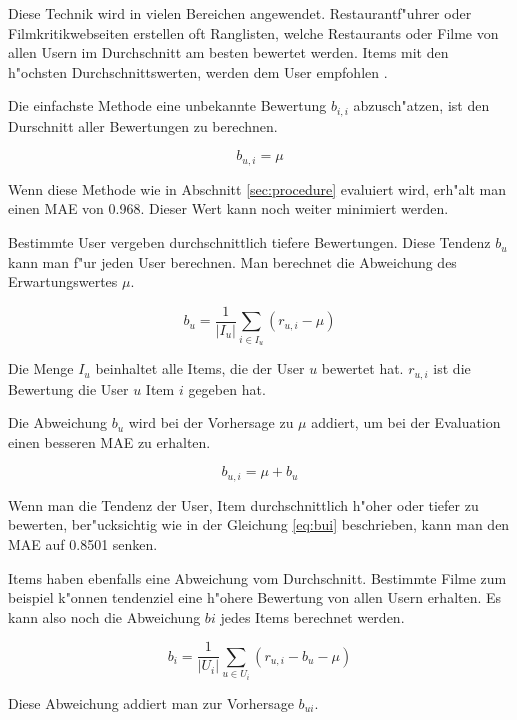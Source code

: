 \documentclass[a4paper, 12pt]{article}
\begin{document}
Diese Technik wird in vielen Bereichen angewendet. Restaurantf"uhrer oder Filmkritikwebseiten erstellen oft Ranglisten, welche Restaurants oder Filme von allen Usern im Durchschnitt am besten bewertet werden. Items mit den h"ochsten Durchschnittswerten, werden dem User empfohlen \cite{jannach11}.

Die einfachste Methode eine unbekannte Bewertung $b_{i,i}$ abzusch"atzen, ist den Durschnitt aller Bewertungen zu berechnen.

\begin{equation}
  \label{eq:avg}
  b_{u,i} = \mu
\end{equation}

Wenn diese Methode wie in Abschnitt \ref{sec:procedure} evaluiert wird, erh"alt man einen MAE von 0.968. Dieser Wert kann noch weiter minimiert werden.

Bestimmte User vergeben durchschnittlich tiefere Bewertungen. Diese Tendenz $b_u$ kann man f"ur jeden User berechnen. Man berechnet die Abweichung des Erwartungswertes $\mu$.

\begin{equation}
  b_u = \frac{1}{|I_u|}\sum_{i \in I_u}(r_{u,i} - \mu)
\end{equation}

Die Menge $I_u$ beinhaltet alle Items, die der User $u$ bewertet hat. $r_{u,i}$ ist die Bewertung die User $u$ Item $i$ gegeben hat.

Die Abweichung $b_u$ wird bei der Vorhersage zu $\mu$ addiert, um bei der Evaluation einen besseren MAE zu erhalten.

\begin{equation}
  \label{eq:bui}
  b_{u,i} = \mu + b_u
\end{equation}

Wenn man die Tendenz der User, Item durchschnittlich h"oher oder tiefer zu bewerten, ber"ucksichtig wie in der Gleichung \ref{eq:bui} beschrieben, kann man den MAE auf 0.8501 senken. 

Items haben ebenfalls eine Abweichung vom Durchschnitt. Bestimmte Filme zum beispiel k"onnen tendenziel eine h"ohere Bewertung von allen Usern erhalten. Es kann also noch die Abweichung $bi$ jedes Items berechnet werden.

\begin{equation}
  \label{eq:bi}
  b_i = \frac{1}{|U_i|}\sum_{u \in U_i}(r_{u,i} - b_u - \mu)
\end{equation}

Diese Abweichung addiert man zur Vorhersage $b_{ui}$.
\end{document}
